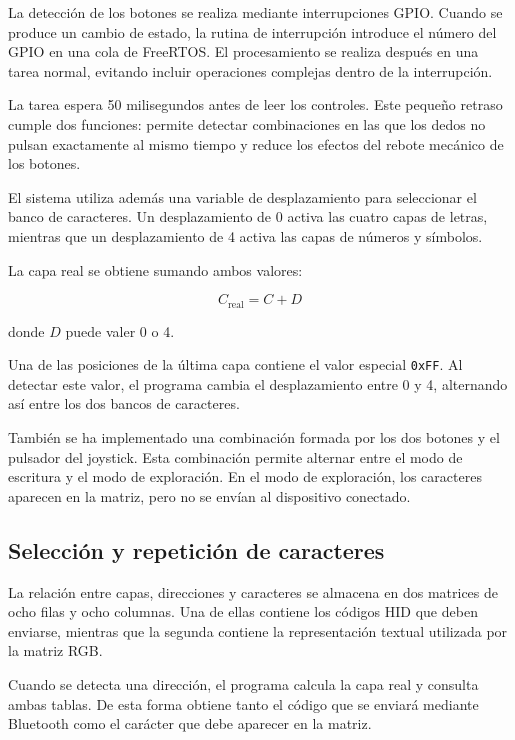 La detección de los botones se realiza mediante interrupciones GPIO. Cuando se produce un cambio de estado, la rutina de interrupción introduce el número del GPIO en una cola de FreeRTOS. El procesamiento se realiza después en una tarea normal, evitando incluir operaciones complejas dentro de la interrupción.

La tarea espera 50 milisegundos antes de leer los controles. Este pequeño retraso cumple dos funciones: permite detectar combinaciones en las que los dedos no pulsan exactamente al mismo tiempo y reduce los efectos del rebote mecánico de los botones.

El sistema utiliza además una variable de desplazamiento para seleccionar el banco de caracteres. Un desplazamiento de 0 activa las cuatro capas de letras, mientras que un desplazamiento de 4 activa las capas de números y símbolos.

La capa real se obtiene sumando ambos valores:

\begin{equation}
    C_{\text{real}} = C + D
\end{equation}

donde \(D\) puede valer 0 o 4.

Una de las posiciones de la última capa contiene el valor especial \texttt{0xFF}. Al detectar este valor, el programa cambia el desplazamiento entre 0 y 4, alternando así entre los dos bancos de caracteres.

También se ha implementado una combinación formada por los dos botones y el pulsador del joystick. Esta combinación permite alternar entre el modo de escritura y el modo de exploración. En el modo de exploración, los caracteres aparecen en la matriz, pero no se envían al dispositivo conectado.

\subsection{Selección y repetición de caracteres}
\label{subsec:seleccion-caracteres}

La relación entre capas, direcciones y caracteres se almacena en dos matrices de ocho filas y ocho columnas. Una de ellas contiene los códigos HID que deben enviarse, mientras que la segunda contiene la representación textual utilizada por la matriz RGB.

Cuando se detecta una dirección, el programa calcula la capa real y consulta ambas tablas. De esta forma obtiene tanto el código que se enviará mediante Bluetooth como el carácter que debe aparecer en la matriz.

